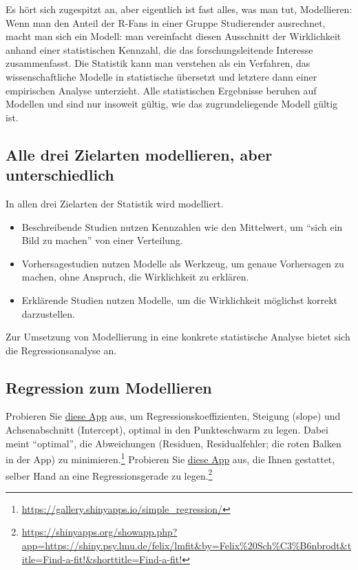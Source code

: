 \documentclass[
  ngerman,
  letterpaper,
  twoside,
  open=any]{scrbook}
\providecommand{\tightlist}{%
  \setlength{\itemsep}{0pt}\setlength{\parskip}{0pt}}\usepackage{longtable,booktabs,array}
\theoremstyle{definition}
\theoremstyle{plain}
\theoremstyle{definition}
\theoremstyle{definition}
\theoremstyle{remark}
\begin{document}
Es hört sich zugespitzt an, aber eigentlich ist fast alles, was man tut,
Modellieren: Wenn man den Anteil der R-Fans in einer Gruppe Studierender
ausrechnet, macht man sich ein Modell: man vereinfacht diesen Ausschnitt
der Wirklichkeit anhand einer statistischen Kennzahl, die das
forschungsleitende Interesse zusammenfasst. Die Statistik kann man
verstehen als ein Verfahren, das wissenschaftliche Modelle in
statistische übersetzt und letztere dann einer empirischen Analyse
unterzieht. Alle statistischen Ergebnisse beruhen auf Modellen und sind
nur insoweit gültig, wie das zugrundeliegende Modell gültig ist.

\subsection{Alle drei Zielarten modellieren, aber
unterschiedlich}\label{alle-drei-zielarten-modellieren-aber-unterschiedlich}

In allen drei Zielarten der Statistik wird modelliert.

\begin{itemize}
\tightlist
\item
  Beschreibende Studien nutzen Kennzahlen wie den Mittelwert, um
  \enquote{sich ein Bild zu machen} von einer Verteilung.
\item
  Vorhersagestudien nutzen Modelle als Werkzeug, um genaue Vorhersagen
  zu machen, ohne Anspruch, die Wirklichkeit zu erklären.
\item
  Erklärende Studien nutzen Modelle, um die Wirklichkeit möglichst
  korrekt darzustellen.
\end{itemize}

Zur Umsetzung von Modellierung in eine konkrete statistische Analyse
bietet sich die Regressionsanalyse an.

\subsection{Regression zum
Modellieren}\label{regression-zum-modellieren}

Probieren Sie
\href{https://gallery.shinyapps.io/simple_regression/}{diese App} aus,
um Regressionskoeffizienten, Steigung (slope) und Achsenabschnitt
(Intercept), optimal in den Punkteschwarm zu legen. Dabei meint
\enquote{optimal}, die Abweichungen (Residuen, Residualfehler; die roten
Balken in der App) zu minimieren.\footnote{\url{https://gallery.shinyapps.io/simple_regression/}}
Probieren Sie
\href{https://shinyapps.org/showapp.php?app=https://shiny.psy.lmu.de/felix/lmfit&by=Felix\%20Sch\%C3\%B6nbrodt&title=Find-a-fit!&shorttitle=Find-a-fit!}{diese
App} aus, die Ihnen gestattet, selber Hand an eine Regressionsgerade zu
legen.\footnote{\url{https://shinyapps.org/showapp.php?app=https://shiny.psy.lmu.de/felix/lmfit&by=Felix\%20Sch\%C3\%B6nbrodt&title=Find-a-fit!&shorttitle=Find-a-fit!}}
\end{document}
